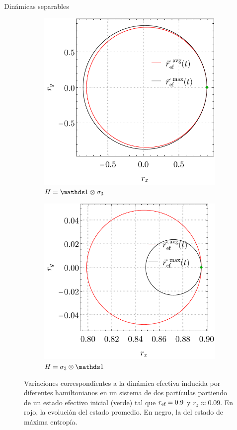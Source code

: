 \begin{frame}{Dinámicas separables}
    \begin{figure}[ht!]
        \centering
        \begin{subfigure}{0.5\textwidth}
          \centering
          \includegraphics[width=0.8\linewidth]{figures/avg_results/local_AvgVSMax_p2=0.1_r=0.9_w1=0_w2=1.pdf}
          \caption{$H=\Id\otimes\pauli{3}$}
        \end{subfigure}%
        \begin{subfigure}{0.5\textwidth}
          \centering
          \includegraphics[width=0.8\linewidth]{figures/avg_results/local_AvgVSMax_p2=0.1_r=0.9_w1=1_w2=0.pdf}
          \caption{$H=\pauli{3}\otimes\Id$}
        \end{subfigure}
        \caption{Variaciones correspondientes a la dinámica efectiva inducida por diferentes hamiltonianos en un sistema de dos partículas partiendo de un estado efectivo inicial (verde) tal que $r_{\text{ef}}=0.9$ y $r_{z}\approx0.09$. En rojo, la evolución del estado promedio. En negro, la del estado de máxima entropía. \label{ap:EffDunAVGvsMaxEnt1}}
    \end{figure}
\end{frame}

